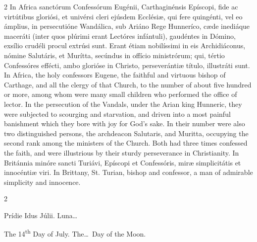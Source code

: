 \begin{paracol}{2}
\switchcolumn*
{}
In Africa sanctórum 
 Confessórum Eugénii, Carthaginénsis Epíscopi, fide ac virtútibus gloriósi, 
 et univérsi cleri ejúsdem Ecclésiæ, qui fere quingénti, vel eo ámplius, in 
 persecutióne Wandálica, sub Ariáno Rege Hunneríco, cæde inediáque maceráti 
 (inter quos plúrimi erant Lectóres infántuli), gaudéntes in Dómino, exsílio 
 crudéli procul extrúsi sunt. Erant étiam nobilíssimi in eis 
 Archidiáconus, nómine Salutáris, et Murítta, secúndus in offício ministrórum; 
 qui, tértio Confessóres effécti, ambo glorióse in Christo, perseverántiæ 
 título, illustráti sunt.
\switchcolumn
{}
In Africa, the holy confessors 
 Eugene, the faithful and virtuous bishop of Carthage, and all the clergy of 
 that Church, to the number of about five hundred or more, among whom were 
 many small children who performed the office of lector. In the 
 persecution of the Vandals, under the Arian king Hunneric, they were 
 subjected to scourging and starvation, and driven into a most painful 
 banishment which they bore with joy for God's sake. In their number 
 were also two distinguished persons, the archdeacon Salutaris, and Muritta, 
 occupying the second rank among the ministers of the Church. Both had 
 three times confessed the faith, and were illustrious by their sturdy 
 perseverance in Christianity.
\switchcolumn*
{}
In Británnia minóre 
 sancti Turiávi, Epíscopi et Confessóris, miræ simplicitátis et innocéntiæ 
 viri.
\switchcolumn
{}
In Brittany, St. Turian, bishop and 
 confessor, a man of admirable simplicity and innocence.
\switchcolumn*
{}
\end{paracol}


\begin{paracol}{2}
\begin{center}{\color{gregoriocolor} Prídie Idus Júlii. 
 Luna\dots\ }\end{center}
\switchcolumn
{}
\begin{center}{\color{gregoriocolor} The 
 14\textsuperscript{th} Day of 
 July. The\dots\ Day of the Moon.}\end{center}
\end{paracol}

